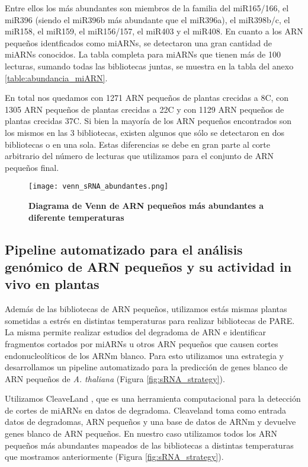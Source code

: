 Entre ellos los más abundantes son miembros de la familia del miR165/166, el miR396 (siendo el miR396b más abundante que el miR396a), el miR398b/c, el miR158, el miR159, el miR156/157, el miR403 y el miR408.
En cuanto a los ARN pequeños identficados como miARNs, se detectaron una gran cantidad de miARNs conocidos.
La tabla completa para miARNs que tienen más de 100 lecturas, sumando todas las bibliotecas juntas, se muestra en la tabla del anexo \ref{table:abundancia_miARN}.

En total nos quedamos con 1271 ARN pequeños de plantas crecidas a 8\degree C, con 1305 ARN pequeños de plantas crecidas a 22\degree C y con 1129 ARN pequeños de plantas crecidas 37\degree C.
Si bien la mayoría de los ARN pequeños encontrados son los mismos en las 3 bibliotecas, existen algunos que sólo se detectaron en dos bibliotecas o en una sola.
Estas diferencias se debe en gran parte al corte arbitrario del número de lecturas que utilizamos para el conjunto de ARN pequeños final.
 
\begin{figure}[htbp!] 
    \centering    
    \texttt{[image: venn\_sRNA\_abundantes.png]}
    \caption[Diagrama de Venn de ARN pequeños más abundantes a diferente temperaturas]{
    \textbf{Diagrama de Venn de ARN pequeños más abundantes a diferente temperaturas}
    }
        
     \label{fig:venn_sRNA_abundantes}
\end{figure}

\subsection{Pipeline automatizado para el análisis genómico de ARN pequeños y su actividad in vivo en plantas}

Además de las bibliotecas de ARN pequeños, utilizamos estás mismas plantas sometidas a estrés en distintas temperaturas para realizar bibliotecas de PARE\citep{pmid19247285}.
La misma permite realizar estudios del degradoma de ARN e identificar fragmentos cortados por miARNs u otros ARN pequeños que causen cortes endonucleolíticos de los ARNm blanco.
Para esto utilizamos una estrategia y desarrollamos un pipeline automatizado para la predicción de genes blanco de ARN pequeños de \textit{A. thaliana} (Figura \ref{fig:sRNA_strategy}).

Utilizamos CleaveLand \citep{pmid19017659}, que es una herramienta computacional para la detección de cortes de miARNs en datos de degradoma.
Cleaveland toma como entrada datos de degradomas, ARN pequeños y una base de datos de ARNm y devuelve genes blanco de ARN pequeños.
En nuestro caso utilizamos todos los ARN pequeños más abundantes mapeados de las bibliotecas a distintas temperaturas que mostramos anteriormente (Figura \ref{fig:sRNA_strategy}).


